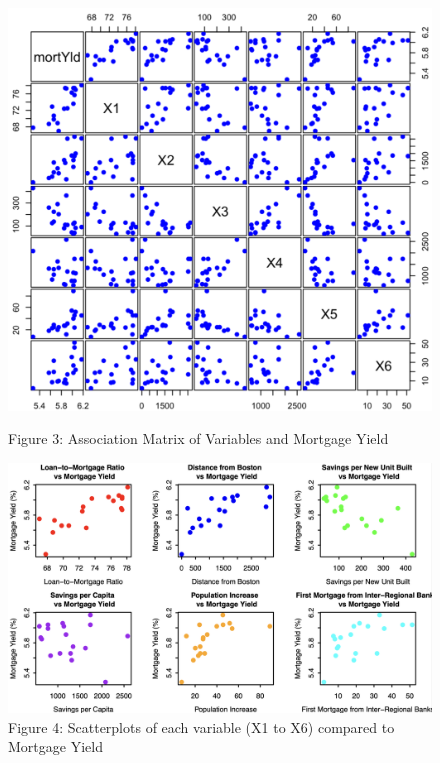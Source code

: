 \documentclass[
  12pt,
]{article}
\begin{document}
\begin{figure}[H]
\centering

\begin{minipage}[t]{0.38\textwidth}
\centering
\includegraphics[width=1\linewidth]{figures/Figure 3.png}
\captionsetup{font=normalsize}
\caption*{Figure 3: Association Matrix of Variables and Mortgage Yield}
\end{minipage}
\hfill
\begin{minipage}[t]{0.58\textwidth}
\centering
\vspace{-6cm}
\includegraphics[width=1\linewidth]{figures/Figure 4.png}
\captionsetup{font=normalsize}
\caption*{Figure 4: Scatterplots of each variable (X1 to X6) compared to Mortgage Yield}
\end{minipage}
\end{figure}
\end{document}
